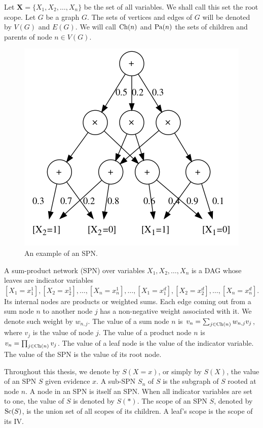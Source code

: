 Let $\mathbf{X}=\{X_1,X_2,\ldots,X_n\}$ be the set of all variables. We shall call this set the
root scope. Let $G$ be a graph $G$. The sets of vertices and edges of $G$ will be denoted by $V(G)$
and $E(G)$. We will call $\operatorname*{\text{Ch}}(n)$ and $\operatorname*{\text{Pa}}(n)$ the sets of children and parents of node $n\in
V(G)$.

\begin{figure}[h]
  \centering\includegraphics[scale=0.6]{graphs/sample_spn.png}
  \caption{An example of an SPN.\label{fig:sample_spn}}
\end{figure}

\begin{definition}
  A sum-product network (SPN) over variables $X_1,X_2,\ldots,X_n$ is a DAG whose leaves are
  indicator variables $[X_1=x_1^1],[X_2=x_2^1],\ldots,[X_n=x_n^1],\ldots,[X_1=x_1^d],[X_2=x_2^d],
  \ldots,[X_n=x_n^d]$. Its internal nodes are products or weighted sums. Each edge coming out from
  a sum node $n$ to another node $j$ has a non-negative weight associated with it. We denote such
  weight by $w_{n,j}$. The value of a sum node $n$ is $v_n=\sum_{j\in\operatorname*{\text{Ch}}(n)}w_{n,j}v_j$, where
  $v_j$ is the value of node $j$. The value of a product node $n$ is $v_n=\prod_{j\in\operatorname*{\text{Ch}}(n)}v_j$.
  The value of a leaf node is the value of the indicator variable. The value of the SPN is the
  value of its root node.
\end{definition}

Throughout this thesis, we denote by $S(X=x)$, or simply by $S(X)$, the value of an SPN $S$ given
evidence $x$. A sub-SPN $S_n$ of $S$ is the subgraph of $S$ rooted at node $n$. A node in an SPN is
itself an SPN\@. When all indicator variables are set to one, the value of $S$ is denoted by
$S(\ast)$. The scope of an SPN $S$, denoted by $\operatorname*{\text{Sc}}(S)$, is the union set of all scopes of its
children. A leaf's scope is the scope of its IV\@.

